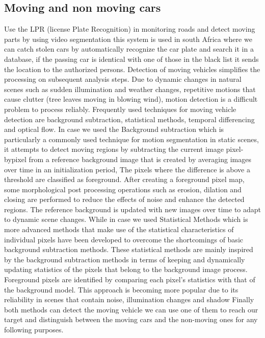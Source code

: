 \subsection{Moving and non moving cars}
\noindent Use the LPR (license Plate Recognition) in monitoring roads and
detect moving parts by using video segmentation this system is
used in south Africa where we can catch stolen cars by
automatically recognize the car plate and search it in a database, if
the passing car is identical with one of those in the black list it
sends the location to the authorized persons. Detection of moving
vehicles simplifies the processing on subsequent analysis steps.
Due to dynamic changes in natural scenes such as sudden
illumination and weather changes, repetitive motions that cause
clutter (tree leaves moving in blowing wind), motion detection is a
difficult problem to process reliably. Frequently used techniques
for moving vehicle detection are background subtraction, statistical
methods, temporal differencing and optical flow. In case we used
the Background subtraction which is particularly a commonly used
technique for motion segmentation in static scenes, it attempts to
detect moving regions by subtracting the current image pixel-bypixel from a reference background image that is created by
averaging images over time in an initialization period, The pixels
where the difference is above a threshold are classified as
foreground. After creating a foreground pixel map, some
morphological post processing operations such as erosion, dilation
and closing are performed to reduce the effects of noise and
enhance the detected regions. The reference background is updated
with new images over time to adapt to dynamic scene changes.
While in case we used Statistical Methods which is more advanced
methods that make use of the statistical characteristics of
individual pixels have been developed to overcome the
shortcomings of basic background subtraction methods. These
statistical methods are mainly inspired by the background
subtraction methods in terms of keeping and dynamically updating
statistics of the pixels that belong to the background image
process. Foreground pixels are identified by comparing each
pixel's statistics with that of the background model. This approach
is becoming more popular due to its reliability in scenes that
contain noise, illumination changes and shadow Finally both
methods can detect the moving vehicle we can use one of them to
reach our target and distinguish between the moving cars and the
non-moving ones for any following purposes.


